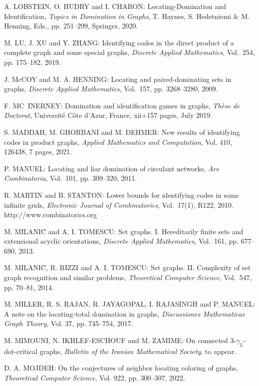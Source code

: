\begin{thebibliography}{999}
A. LOBSTEIN, O. HUDRY and I. CHARON: Locating-Domination and Identification, {\it Topics in Domination in Graphs}, T. Haynes, S. Hedetniemi \& M. Henning, Eds., pp. 251--299, Springer, 2020.

M. LU, J. XU and Y. ZHANG: Identifying codes in the direct product of a complete graph and some special graphs, {\it Discrete Applied Mathematics}, Vol.~254, pp. 175--182, 2019.

J. McCOY and M. A. HENNING: Locating and paired-dominating sets in graphs, {\it Discrete Applied Mathematics}, Vol.~157, pp. 3268--3280, 2009.

F. MC~INERNEY: Domination and identification games in graphs, {\it Th\`ese de Doctorat}, Universit\'e C\^ote d'Azur, France, xii+157 pages, July 2019.

S. MADDAH, M. GHORBANI and M. DEHMER: New results of identifying codes in product graphs, {\it Applied Mathematics and Computation}, Vol. 410, 126438, 7 pages, 2021.

P. MANUEL: Locating and liar domination of circulant networks, {\it Ars Combinatoria}, Vol.~101, pp. 309--320, 2011.

R. MARTIN and B. STANTON: Lower bounds for identifying codes in some infinite grids, {\it Electronic Journal of Combinatorics}, Vol.~17(1), R122, 2010.\\
http://www.combinatorics.org

M. MILANI\u{C} and A. I. TOMESCU: Set graphs. I. Hereditarily finite sets and extensional acyclic orientations, {\it Discrete Applied Mathematics}, Vol.~161, pp. 677--690, 2013.

M. MILANI\u{C}, R. RIZZI and A. I. TOMESCU: Set graphs. II. Complexity of set graph recognition and similar problems, {\it Theoretical Computer Science}, Vol.~547, pp. 70--81, 2014.

M. MILLER, R. S. RAJAN, R. JAYAGOPAL, I. RAJASINGH and P. MA\-NUEL: A note on the locating-total domination in graphs, {\it Discussiones Mathematicae Graph Theory}, Vol. 37, pp. 745--754, 2017.

M. MIMOUNI, N. IKHLEF-ESCHOUF and M. ZAMIME: On connected 3-$\gamma_L$-dot-critical graphs, {\it Bulletin of the Iranian Mathematical Society}, to appear.

D. A. MOJDEH: On the conjectures of neighbor locating coloring of graphs, {\it Theoretical Computer Science}, Vol. 922, pp. 300--307, 2022.


\end{thebibliography}
